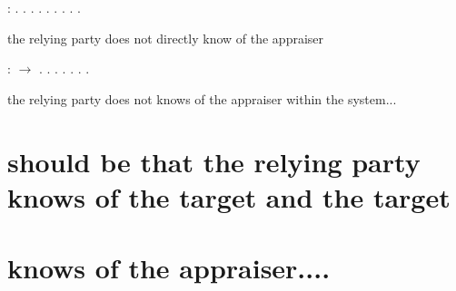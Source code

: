 \documentclass[12pt]{report}
\begin{document}
\begin{coqdoccode}
\coqdocemptyline
\coqdocnoindent
{} :    .\coqdoceol
\coqdocnoindent
{}.\coqdoceol
\coqdocnoindent
{} . . .  . . .\coqdoceol
\coqdocnoindent
{}.\coqdoceol
\coqdocemptyline
\end{coqdoccode}
the relying party does not directly know of the appraiser
 
\begin{coqdoccode}
\coqdocemptyline
\coqdocnoindent
{} :     \ensuremath{\rightarrow} .\coqdoceol
\coqdocnoindent
{}.\coqdoceol
\coqdocindent{1.00em}
 . . .  .\coqdoceol
\coqdocnoindent
{}.\coqdoceol
\coqdocemptyline
\end{coqdoccode}
the relying party does not knows of the appraiser within the system... 
\section{should be that the relying party knows of the target and the target}


\section{knows of the appraiser....}
\end{document}
